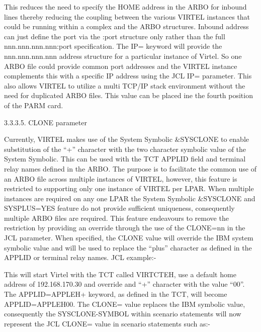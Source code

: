 \documentclass[letterpaper,10pt,english]{sphinxmanual}
\begin{document}
This reduces the need to specify the HOME address in the ARBO for inbound lines thereby reducing the coupling between the various VIRTEL instances that could be running within a complex and the ARBO structures. Inbound address can just define the port via the :port structure only rather than the full nnn.nnn.nnn.nnn:port specification. The IP= keyword will provide the nnn.nnn.nnn.nnn address structure for a particular instance of Virtel. So one ARBO file could provide common port addresses and the VIRTEL instance complements this with a specific IP address using the JCL IP= parameter. This also allows VIRTEL to utilize a multi TCP/IP stack environment without the need for duplicated ARBO files. This value can be placed ine the fourth position of the PARM card.

3.3.3.5. CLONE parameter

Currently, VIRTEL makes use of the System Symbolic \&SYSCLONE to enable substitution of the “+” character with the two character symbolic value of the System Symbolic. This can be used with the TCT APPLID field and terminal relay names defined in the ARBO. The purpose is to facilitate the common use of an ARBO file across multiple instances of VIRTEL, however, this feature is restricted to supporting only one instance of VIRTEL per LPAR. When multiple instances are required on any one LPAR the System Symbolic \&SYSCLONE and SYSPLUS=YES feature do not provide sufficient uniqueness, consequently multiple ARBO files are required. This feature endeavours to remove the restriction by providing an override through the use of the CLONE=nn in the JCL parameter. When specified, the CLONE value will override the IBM system symbolic value and will be used to replace the “plus” character as defined in the APPLID or terminal relay names. JCL example:-

\begin{sphinxVerbatim}[commandchars=\\\{\}]
  
\end{sphinxVerbatim}

This will start Virtel with the TCT called VIRTCTEH, use a default home address of 192.168.170.30 and override and “+” character with the value “00”. The APPLID=APPLEH+ keyword, as defined in the TCT, will become APPLID=APPLEH00. The CLONE= value replaces the IBM symbolic value, consequently the SYSCLONE-SYMBOL within scenario statements will now represent the JCL CLONE= value in scenario statements such as:-
\end{document}
